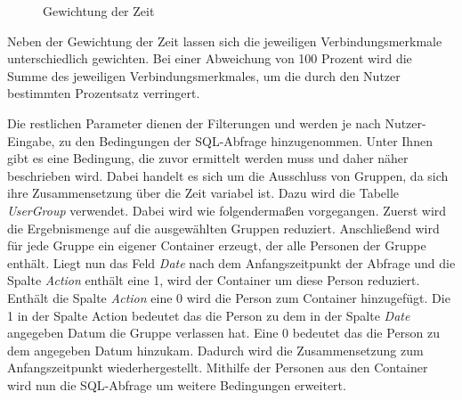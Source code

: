 \begin{figure}[htbp]
\begin{center}
\end{center}
\caption{Gewichtung der Zeit}
\label{fig:umsetzung:gewichtungderzeit}
\end{figure}

Neben der Gewichtung der Zeit lassen sich die jeweiligen Verbindungsmerkmale unterschiedlich gewichten. Bei einer Abweichung von 100 Prozent wird die Summe des jeweiligen Verbindungsmerkmales, um die durch den Nutzer bestimmten Prozentsatz verringert. 

Die restlichen Parameter dienen der Filterungen und werden je nach Nutzer-Eingabe, zu den Bedingungen der SQL-Abfrage hinzugenommen. Unter Ihnen gibt es eine Bedingung, die zuvor ermittelt werden muss und daher näher beschrieben wird. Dabei handelt es sich um die Ausschluss von Gruppen, da sich ihre Zusammensetzung über die Zeit variabel ist. Dazu wird die Tabelle \textit{UserGroup} verwendet. Dabei wird wie folgendermaßen vorgegangen. Zuerst wird die Ergebnismenge auf die ausgewählten Gruppen reduziert. Anschließend wird für jede Gruppe ein eigener Container erzeugt, der alle Personen der Gruppe enthält. Liegt nun das Feld \textit{Date} nach dem Anfangszeitpunkt der Abfrage und die Spalte \textit{Action} enthält eine 1, wird der Container um diese Person reduziert. Enthält die Spalte \textit{Action} eine 0 wird die Person zum Container hinzugefügt. Die 1 in der Spalte Action bedeutet das die Person zu dem in der Spalte \textit{Date} angegeben Datum die Gruppe verlassen hat. Eine 0 bedeutet das die Person zu dem angegeben Datum hinzukam. Dadurch wird die Zusammensetzung zum Anfangszeitpunkt wiederhergestellt. Mithilfe der Personen aus den Container wird nun die SQL-Abfrage um weitere Bedingungen erweitert.

